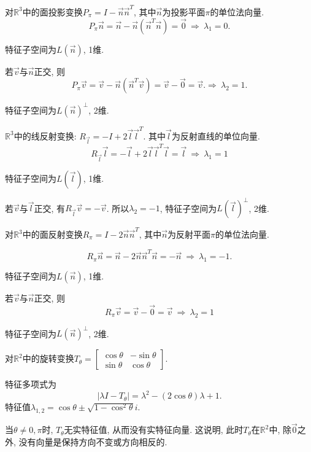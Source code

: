 \begin{eg}
对$\mathbb{R}^3$中的面投影变换$P_{\pi}=I-\vec{n}\vec{n}^T$, 其中$\vec{n}$为投影平面$\pi$的单位法向量.
$$P_{\pi}\vec{n}=\vec{n}-\vec{n}(\vec{n}^T\vec{n})=\vec{0}\ \Rightarrow \ \lambda_1=0.$$

特征子空间为$L(\vec{n})$, 1维.

若$\vec{v}$与$\vec{n}$正交, 则$$P_{\pi}\vec{v}=\vec{v}-\vec{n}(\vec{n}^T\vec{v})=\vec{v}-\vec{0}=\vec{v}. \Rightarrow \ \lambda_2=1.$$

特征子空间为$L(\vec{n})^{\bot}$, 2维.

\end{eg}

\begin{eg}
$\mathbb{R}^3$中的线反射变换: $R_{\vec{l}}=-I+2\vec{l}\vec{l}^T$. 其中$\vec{l}$为反射直线的单位向量.
$$R_{\vec{l}}\vec{l}=-\vec{l}+2\vec{l}\vec{l}^T\vec{l}=\vec{l}\ \Rightarrow \  \lambda_1=1$$

特征子空间为$L(\vec{l})$, 1维.

若$\vec{v}$与$\vec{l}$正交, 有$R_{\vec{l}}\vec{v}=-\vec{v}$. 所以$\lambda_2=-1$, 特征子空间为$L(\vec{l})^{\bot}$, 2维.
\end{eg}

\begin{eg}
对$\mathbb{R}^3$中的面反射变换$R_{\pi}=I-2\vec{n}\vec{n}^T$, 其中$\vec{n}$为反射平面$\pi$的单位法向量.

$$R_{\pi}\vec{n}=\vec{n}-2\vec{n}\vec{n}^T\vec{n}=-\vec{n}\ \Rightarrow \ \lambda_1=-1.$$

特征子空间为$L(\vec{n})$, 1维.

若$\vec{v}$与$\vec{n}$正交, 则$$R_{\pi}\vec{v}=\vec{v}-\vec{0}=\vec{v}\ \Rightarrow \ \lambda_2=1$$

特征子空间为$L(\vec{n})^{\bot}$, 2维.

\end{eg}

\begin{eg}
对$\mathbb{R}^2$中的旋转变换$T_{\theta}=\begin{bmatrix} \cos\theta&-\sin\theta\\ \sin\theta&\cos\theta\end{bmatrix}.$

特征多项式为
$$|\lambda I-T_{\theta}|=\lambda^2-(2\cos\theta)\lambda +1.$$
特征值$\lambda_{1,2}=\cos\theta\pm\sqrt{1-\cos^2\theta}i.$

当$\theta\not=0,\pi$时, $T_{\theta}$无实特征值, 从而没有实特征向量. 这说明, 此时$T_{\theta}$在$\mathbb{R}^2$中, 除$\vec{0}$之外, 没有向量是保持方向不变或方向相反的.
\end{eg}


